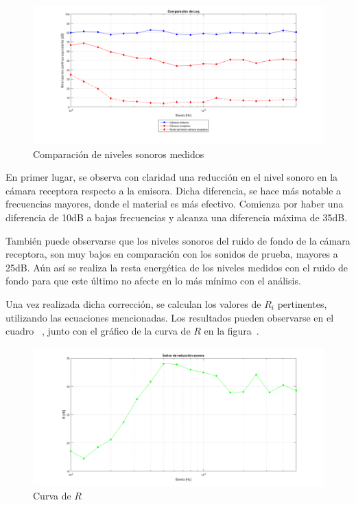 \begin{figure}[H]
	\centering
	\includegraphics[scale=0.48]{./img/Comparacion_Leq.png}
	\caption{Comparación de niveles sonoros medidos}
	\label{fig::comparacion_niveles_sonoros}
\end{figure}

\par En primer lugar, se observa con claridad una reducción en el nivel sonoro en la cámara receptora respecto a la emisora. Dicha diferencia, se hace más notable a frecuencias mayores, donde el material es más efectivo. Comienza por haber una diferencia de 10dB a bajas frecuencias y alcanza una diferencia máxima de 35dB. 


\par También puede observarse que los niveles sonoros del ruido de fondo de la cámara receptora, son muy bajos en comparación con los sonidos de prueba, mayores  a 25dB. Aún así se realiza la resta energética de los niveles medidos con el ruido de fondo para que este último no afecte en lo más mínimo con el análisis.\\

\par Una vez realizada dicha corrección, se calculan los valores de $R_i$ pertinentes, utilizando las ecuaciones mencionadas. Los resultados pueden observarse en el cuadro~ , junto con el gráfico de la curva de $R$ en la figura~.

\begin{figure}[H]
	\centering
	\includegraphics[scale=0.48]{./img/Indice_reduccion_sonora.png}
	\caption{Curva de $R$}
	\label{fig::indice_reduccion_sonora}
\end{figure}


